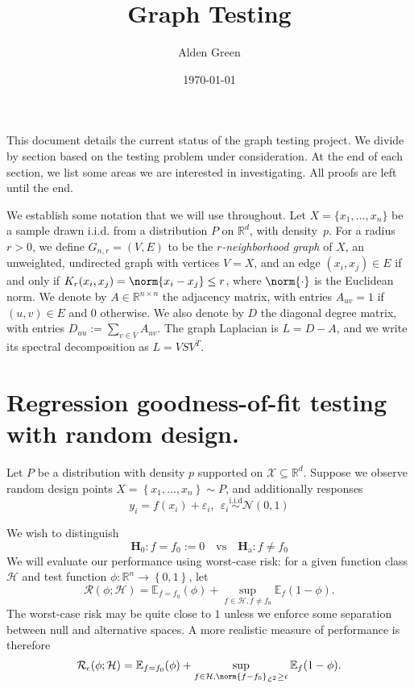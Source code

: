 \documentclass{article}
\newcommand{\Reals}{\mathbb{R}}
\newcommand{\set}[1]{\left\{#1\right\}}
\newcommand{\1}{\mathbf{1}}
\newcommand{\Rd}{\Reals^d}
\newcommand{\Leb}{\mathcal{L}}
\newcommand{\Ebb}{\mathbb{E}}
\theoremstyle{alden}
\theoremstyle{aldenthm}
\theoremstyle{definition}
\theoremstyle{remark}
\begin{document}
\title{Graph Testing}
\author{Alden Green}
\date{\today}
\maketitle

This document details the current status of the graph testing project. We divide by section based on the testing problem under consideration. At the end of each section, we list some areas we are interested in investigating. All proofs are left until the end.

We establish some notation that we will use throughout. Let $X = \{x_1,
\ldots, x_n\}$ be a sample drawn i.i.d. from a distribution $P$ on $\Rd$,
with density~$p$.  For a radius $r > 0$, we define $G_{n,r}=(V,E)$ to be the
\emph{$r$-neighborhood graph} of $X$, an unweighted, undirected graph with
vertices $V=X$, and an edge $(x_i,x_j) \in E$ if and only if $K_r(x_i,x_j) = \norm{x_i -x_j} \leq r$, where $\norm{\cdot}$ is the Euclidean norm. We denote by $A \in
\Reals^{n \times n}$ the adjacency matrix, with entries $A_{uv} = 1$ if
$(u,v) \in E$ and $0$ otherwise.  We also denote by $D$ the diagonal degree
matrix, with entries $D_{uu} := \sum_{v \in V} A_{uv}$. The graph Laplacian is $L = D - A$, and we write its spectral decomposition as $L = V S V^T$. 

\section{Regression goodness-of-fit testing with random design.}

Let $P$ be a distribution with density $p$ supported on $\mathcal{X} \subseteq \Reals^d$. Suppose we observe random design points $X = \set{x_1,\ldots,x_n} \sim P$, and additionally responses
\begin{equation}
\label{eqn:regression_known_variance}
y_i = f(x_i) + \varepsilon_i, ~~ \varepsilon_i \overset{\textrm{i.i.d}}{\sim} \mathcal{N}(0,1)
\end{equation} 

We wish to distinguish
\begin{equation*}
\mathbf{H}_0: f = f_0 := 0 \quad \textrm{vs} \quad \mathbf{H}_{\textrm{a}}: f \neq f_0
\end{equation*}
We will evaluate our performance using worst-case risk: for a given function class $\mathcal{H}$ and test function $\phi: \Reals^n \to \set{0,1}$, let
\begin{equation*}
\mathcal{R}(\phi; \mathcal{H}) = \Ebb_{f = f_0}(\phi) + \sup_{f \in \mathcal{H}, f \neq f_0} \Ebb_f(1 - \phi).
\end{equation*}
The worst-case risk may be quite close to $1$ unless we enforce some separation between null and alternative spaces. A more realistic measure of performance is therefore
\begin{equation*}
\mathcal{R}_{\epsilon}(\phi; \mathcal{H}) = \Ebb_{f = f_0}(\phi) + \sup_{f \in \mathcal{H}, \norm{f - f_0}_{\Leb^2} \geq \epsilon} \Ebb_f(1 - \phi).
\end{equation*}
\end{document}
